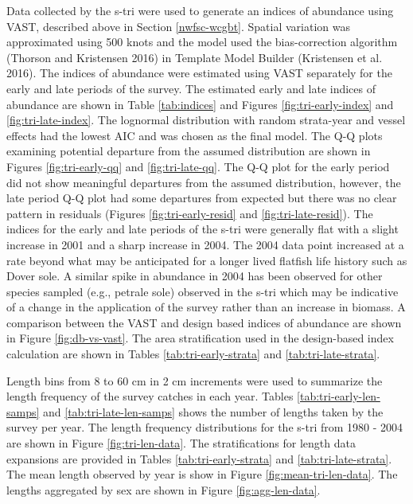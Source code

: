 \documentclass[11pt,
  english,
  a4paper,
]{article}
\begin{document}
Data collected by the \gls{s-tri} were used to generate an indices of abundance using VAST, described above in Section \ref{nwfsc-wcgbt}. Spatial variation was approximated using 500 knots and the model used the bias-correction algorithm {(Thorson and Kristensen 2016)\leavevmode\tagmcend\tagstructend} in Template Model Builder {(Kristensen et al. 2016)\leavevmode\tagmcend\tagstructend}. The indices of abundance were estimated using VAST separately for the early and late periods of the survey. The estimated early and late indices of abundance are shown in Table \ref{tab:indices} and Figures \ref{fig:tri-early-index} and \ref{fig:tri-late-index}. The lognormal distribution with random strata-year and vessel effects had the lowest AIC and was chosen as the final model. The Q-Q plots examining potential departure from the assumed distribution are shown in Figures \ref{fig:tri-early-qq} and \ref{fig:tri-late-qq}. The Q-Q plot for the early period did not show meaningful departures from the assumed distribution, however, the late period Q-Q plot had some departures from expected but there was no clear pattern in residuals (Figures \ref{fig:tri-early-resid} and \ref{fig:tri-late-resid}). The indices for the early and late periods of the \gls{s-tri} were generally flat with a slight increase in 2001 and a sharp increase in 2004. The 2004 data point increased at a rate beyond what may be anticipated for a longer lived flatfish life history such as Dover sole. A similar spike in abundance in 2004 has been observed for other species sampled (e.g., petrale sole) observed in the \gls{s-tri} which may be indicative of a change in the application of the survey rather than an increase in biomass. A comparison between the VAST and design based indices of abundance are shown in Figure \ref{fig:db-vs-vast}. The area stratification used in the design-based index calculation are shown in Tables \ref{tab:tri-early-strata} and \ref{tab:tri-late-strata}.

\leavevmode\tagmcend\tagstructend\par


Length bins from 8 to 60 cm in 2 cm increments were used to summarize the length frequency of the survey catches in each year. Tables \ref{tab:tri-early-len-samps} and \ref{tab:tri-late-len-samps} shows the number of lengths taken by the survey per year. The length frequency distributions for the \gls{s-tri} from 1980 - 2004 are shown in Figure \ref{fig:tri-len-data}. The stratifications for length data expansions are provided in Tables \ref{tab:tri-early-strata} and \ref{tab:tri-late-strata}. The mean length observed by year is show in Figure \ref{fig:mean-tri-len-data}. The lengths aggregated by sex are shown in Figure \ref{fig:agg-len-data}.
\end{document}
